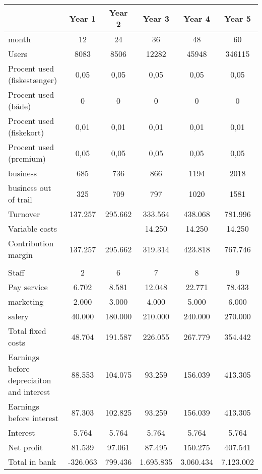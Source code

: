 \begin{tabular}{|p{4cm}|c|c|c|c|c|}
\hline
\rowcolor[HTML]{C0C0C0}  & Year 1 & Year 2 & Year 3 & Year 4 & Year 5 \\ \hline
month & 12 & 24 & 36 & 48 & 60 \\ \hline
\rowcolor[HTML]{C0C0C0} Users & 8083 & 8506 & 12282 & 45948 & 346115 \\ \hline
Procent used (fiskestænger) & 0,05 & 0,05 & 0,05 & 0,05 & 0,05 \\ \hline
\rowcolor[HTML]{C0C0C0} Procent used (både) & 0 & 0 & 0 & 0 & 0 \\ \hline
Procent used (fiskekort) & 0,01 & 0,01 & 0,01 & 0,01 & 0,01 \\ \hline
\rowcolor[HTML]{C0C0C0} Procent used (premium) & 0,05 & 0,05 & 0,05 & 0,05 & 0,05 \\ \hline
business & 685 & 736 & 866 & 1194 & 2018 \\ \hline
\rowcolor[HTML]{C0C0C0} business out of trail & 325 & 709 & 797 & 1020 & 1581 \\ \hline \hline
Turnover & 137.257 & 295.662 & 333.564 & 438.068 & 781.996 \\ \hline
\rowcolor[HTML]{C0C0C0} Variable costs &  &  & 14.250 & 14.250 & 14.250 \\ \hline
Contribution margin & 137.257 & 295.662 & 319.314 & 423.818 & 767.746 \\ \hline \hline
\rowcolor[HTML]{C0C0C0} \multicolumn{6}{|l|}{Fixed cost} \\ \hline
Staff & 2 & 6 & 7 & 8 & 9 \\ \hline
\rowcolor[HTML]{C0C0C0} Pay service & 6.702 & 8.581 & 12.048 & 22.771 & 78.433 \\ \hline
marketing & 2.000 & 3.000 & 4.000 & 5.000 & 6.000 \\ \hline
\rowcolor[HTML]{C0C0C0} salery & 40.000 & 180.000 & 210.000 & 240.000 & 270.000 \\ \hline
Total fixed costs & 48.704 & 191.587 & 226.055 & 267.779 & 354.442 \\ \hline \hline
\rowcolor[HTML]{C0C0C0} Earnings before depreciaiton and interest & 88.553 & 104.075 & 93.259 & 156.039 & 413.305 \\ \hline \hline
Earnings before interest & 87.303 & 102.825 & 93.259 & 156.039 & 413.305 \\ \hline \hline
\rowcolor[HTML]{C0C0C0} Interest & 5.764 & 5.764 & 5.764 & 5.764 & 5.764 \\ \hline \hline
Net profit & 81.539 & 97.061 & 87.495 & 150.275 & 407.541 \\ \hline
\rowcolor[HTML]{C0C0C0} Total in bank & -326.063 & 799.436 & 1.695.835 & 3.060.434 & 7.123.002 \\ \hline
\end{tabular}

